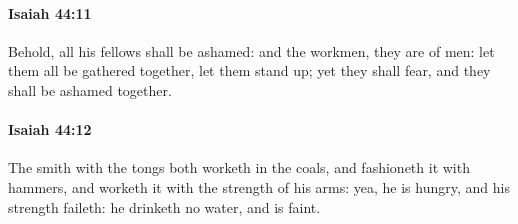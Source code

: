		\paragraph{Isaiah 44:11} %
			\label{ISAIAH-44-11}

			Behold, all his fellows shall be ashamed: and the workmen, they are of men: let them all be gathered together, let them stand up; yet they shall fear, and they shall be ashamed together.


		\paragraph{Isaiah 44:12} %
			\label{ISAIAH-44-12}

			The smith with the tongs both worketh in the coals, and fashioneth it with hammers, and worketh it with the strength of his arms: yea, he is hungry, and his strength faileth: he drinketh no water, and is faint.


